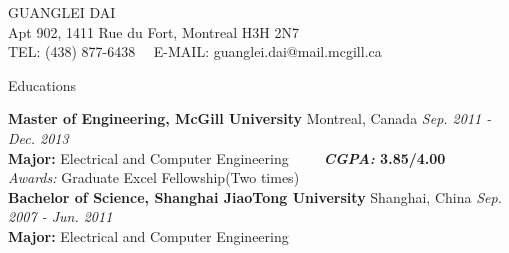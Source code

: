 \documentclass[11pt]{article}
\newenvironment{changemargin}[2]{%
  \begin{list}{}{%
    \setlength{\topsep}{0pt}%
    \setlength{\leftmargin}{#1}%
    \setlength{\rightmargin}{#2}%
    \setlength{\listparindent}{\parindent}%
    \setlength{\itemindent}{\parindent}%
    \setlength{\parsep}{\parskip}%
  }%
  \item[]}{\end{list}
}
\newcommand{\lineover}{
	\begin{changemargin}{-0.05in}{-0.05in}
		\vspace*{-8pt}
		\hrulefill \\
		\vspace*{-2pt}
	\end{changemargin}
}
\newcommand{\header}[1]{
	\begin{changemargin}{-0.5in}{-0.5in}
		\scshape{#1}\\
  	\lineover
	\end{changemargin}
}
\newcommand{\contact}[4]{
	\begin{changemargin}{-0.5in}{-0.5in}
		\begin{center}
			{\Large \scshape {#1}}\\ \smallskip
			{#2}\\ \smallskip
			{#3}\\ \smallskip
			{#4}\smallskip
		\end{center}
	\end{changemargin}
}
\newenvironment{body} {
	\vspace*{-16pt}
	\begin{changemargin}{-0.25in}{-0.5in}
  }	
	{\end{changemargin}
}
\begin{document}
\small
\contact{GUANGLEI DAI}{Apt 902, 1411 Rue du Fort,
Montreal H3H 2N7}{TEL: (438) 877-6438~~ E-MAIL: guanglei.dai@mail.mcgill.ca}

\header{Educations}
\begin{body}
	\vspace{14pt}
	\textbf{Master of Engineering, McGill University} {Montreal, Canada}   \hfill \emph{Sep. 2011 - Dec. 2013}{}  \\
	\textbf{Major:} Electrical and Computer Engineering~~~~~\textbf{\emph{CGPA:} 3.85/4.00} \\
	\emph{Awards:} Graduate Excel Fellowship(Two times)\\

  \medskip	  
	\textbf{Bachelor of Science, Shanghai JiaoTong University} {Shanghai, China}   \hfill \emph{Sep. 2007 - Jun. 2011} \\
	\textbf{Major:} Electrical and Computer Engineering ~~~~~ \\
\end{body}
\smallskip
\end{document}
